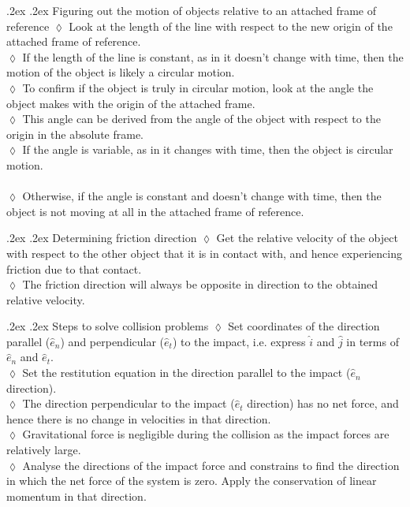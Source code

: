 \documentclass[10pt,landscape,a4paper]{article}
\makeatletter
\renewcommand{\subsection}{\@startsection{subsection}{1}{0mm}%
  {.2ex}%
  {.2ex}%
  {\sffamily\bfseries}}
\makeatother
\begin{document}
\begin{multicols*}{5}
  \subsection{Figuring out the motion of objects relative to an attached frame of reference}
  \(\lozenge\) Look at the length of the line with respect to the new origin of the attached frame of reference. \\
  \(\lozenge\) If the length of the line is constant, as in it doesn't change with time, then the motion of the object is likely a circular motion. \\
  \(\lozenge\) To confirm if the object is truly in circular motion, look at the angle the object makes with the origin of the attached frame. \\
  \(\lozenge\) This angle can be derived from the angle of the object with respect to the origin in the absolute frame. \\
  \(\lozenge\) If the angle is variable, as in it changes with time, then the object is circular motion. \\\\
  \(\lozenge\) Otherwise, if the angle is constant and doesn't change with time, then the object is not moving at all in the attached frame of reference.

  \subsection{Determining friction direction}
  \(\lozenge\) Get the relative velocity of the object with respect to the other object that it is in contact with, and hence experiencing friction due to that contact. \\
  \(\lozenge\) The friction direction will always be opposite in direction to the obtained relative velocity.

  \subsection{Steps to solve collision problems}
  \(\lozenge\) Set coordinates of the direction parallel (\(\hat{e}_n\)) and perpendicular (\(\hat{e}_t\)) to the impact, i.e. express \(\hat{i}\) and \(\hat{j}\) in terms of \(\hat{e}_n\) and \(\hat{e}_t\). \\
  \(\lozenge\) Set the restitution equation in the direction parallel to the impact (\(\hat{e}_n\) direction). \\
  \(\lozenge\) The direction perpendicular to the impact (\(\hat{e}_t\) direction) has no net force, and hence there is no change in velocities in that direction. \\
  \(\lozenge\) Gravitational force is negligible during the collision as the impact forces are relatively large. \\
  \(\lozenge\) Analyse the directions of the impact force and constrains to find the direction in which the net force of the system is zero. Apply the conservation of linear momentum in that direction.


\end{multicols*}
\end{document}
